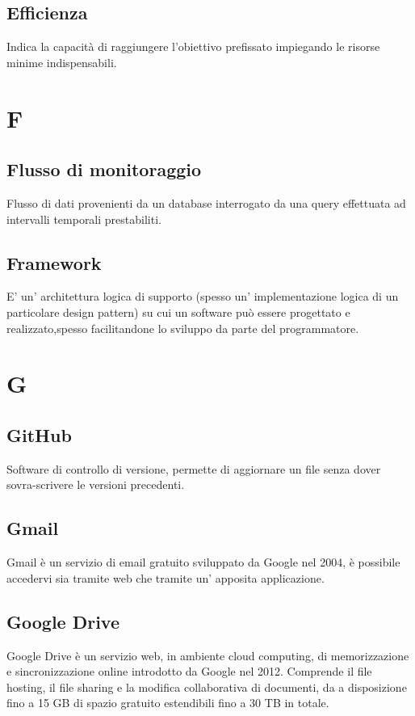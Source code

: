     \subsection*{Efficienza}
Indica la capacità di raggiungere l’obiettivo prefissato impiegando le risorse minime indispensabili.
\newpage
    
\section{F}
    \subsection*{Flusso di monitoraggio}
Flusso di dati provenienti da un database interrogato da una query effettuata ad intervalli temporali prestabiliti.
    \subsection*{Framework}
E’ un’ architettura logica di supporto (spesso un’ implementazione logica di un particolare design pattern) su cui un software può essere progettato e realizzato,spesso facilitandone lo sviluppo da parte del programmatore.
\newpage
    
\section{G}
    \subsection*{GitHub}
Software di controllo di versione, permette di aggiornare un file senza dover sovra-scrivere le versioni precedenti.
    \subsection*{Gmail}
Gmail è un servizio di email gratuito sviluppato da Google nel 2004, è possibile accedervi sia tramite web che tramite un’ apposita applicazione.
    \subsection*{Google Drive}
Google Drive è un servizio web, in ambiente cloud computing, di memorizzazione e sincronizzazione online introdotto da Google nel 2012. Comprende il file hosting, il file sharing e la modifica collaborativa di documenti, da a disposizione fino a 15 GB di spazio gratuito estendibili fino a 30 TB in totale.
